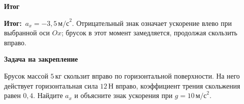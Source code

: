 \documentclass[a4paper,12pt]{article}
\newcommand{\subblock}[1]{\par\medskip\textbf{\color{deepaccent}#1}\par\vspace{-2pt}}
\newcommand{\resultlabel}{\textcolor{deepaccent}{\textbf{Итог:}}}
\begin{document}
\subblock{Итог}
\resultlabel\ $\boxed{a_x=-3{,}5\,\text{м/с}^2}$. Отрицательный знак означает ускорение влево при выбранной оси $Ox$; брусок в этот момент замедляется, продолжая скользить вправо.

\subblock{Задача на закрепление}
Брусок массой $5\,\text{кг}$ скользит вправо по горизонтальной поверхности. На него действует горизонтальная сила $12\,\text{Н}$ вправо, коэффициент трения скольжения равен $0{,}4$. Найдите $a_x$ и объясните знак ускорения при $g=10\,\text{м/с}^2$.
\end{document}

